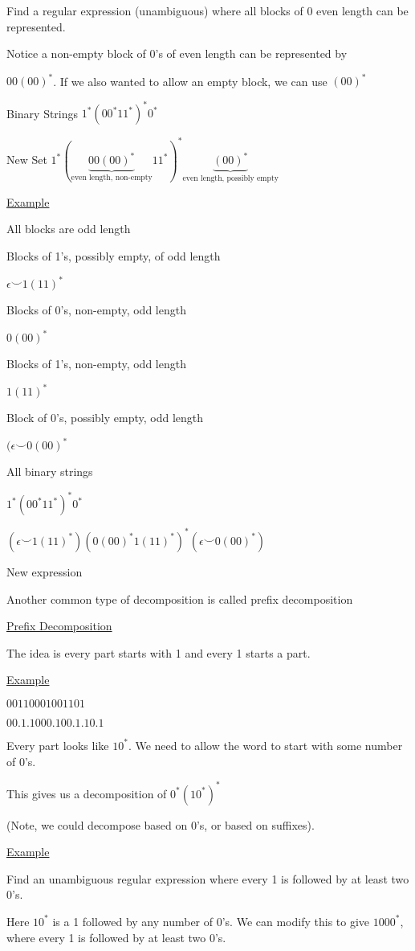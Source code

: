 \documentclass{article}
\begin{document}
Find a regular expression (unambiguous) where all blocks of 0 even length can be represented.

Notice a non-empty block of $0$'s of even length can be represented by 

$00(00)^*$. If we also wanted to allow an empty block, we can use $(00)^*$

Binary Strings $1^*(00^*11^*)^*0^*$

New Set $1^*(\underbrace{00(00)^*}_{\text{even length, non-empty}}11^*)^*\underbrace{(00)^*}_{\text{even length, possibly empty}}$

\underline{Example}

All blocks are odd length

Blocks of 1's, possibly empty, of odd length

$\epsilon \smile 1(11)^*$

Blocks of 0's, non-empty, odd length

$0(00)^*$

Blocks of 1's, non-empty, odd length

$1(11)^*$

Block of 0's, possibly empty, odd length

$(\epsilon \smile 0(00)^*$

All binary strings

$1^*(00^*11^*)^*0^*$

$(\epsilon \smile 1(11)^*)(0(00)^*1(11)^*)^*(\epsilon \smile 0(00)^*)$

New expression

Another common type of decomposition is called prefix decomposition

\underline{Prefix Decomposition}


The idea is every part starts with 1 and every 1 starts a part.

\underline{Example}

$00110001001101$

$00.1.1000.100.1.10.1$

Every part looks like $10^*$. We need to allow the word to start with some number of 0's. 

This gives us a decomposition of $0^*(10^*)^*$

(Note, we could decompose based on 0's, or based on suffixes). 

\underline{Example}

Find an unambiguous regular expression where every 1 is followed by at least two 0's. 

Here $10^*$ is a 1 followed by any number of 0's. We can modify this to give $1000^*$, where every 1 is followed by at least two 0's. 
\end{document}
